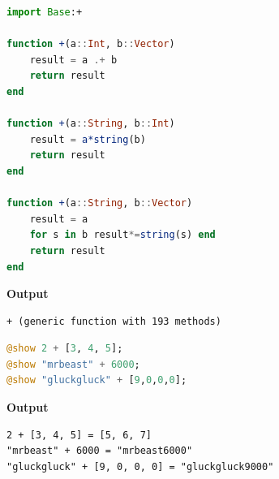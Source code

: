 \begin{lstlisting}[language=Julia,style=mystyle]
import Base:+ 

function +(a::Int, b::Vector)
    result = a .+ b
    return result
end

function +(a::String, b::Int)
    result = a*string(b)
    return result
end

function +(a::String, b::Vector) 
    result = a
    for s in b result*=string(s) end
    return result
end
\end{lstlisting}
\textbf{Output} 
\begin{verbatim}
+ (generic function with 193 methods)
\end{verbatim}

\begin{lstlisting}[language=Julia,style=mystyle]
@show 2 + [3, 4, 5];
@show "mrbeast" + 6000;
@show "gluckgluck" + [9,0,0,0];
\end{lstlisting}
\textbf{Output} 
\begin{verbatim}
2 + [3, 4, 5] = [5, 6, 7]
"mrbeast" + 6000 = "mrbeast6000"
"gluckgluck" + [9, 0, 0, 0] = "gluckgluck9000"
\end{verbatim}
